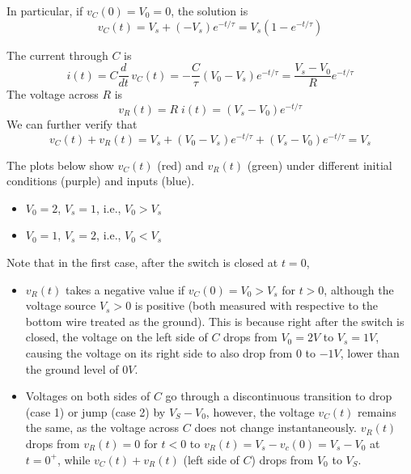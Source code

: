 \documentclass{article}
\begin{document}
In particular, if $v_C(0)=V_0=0$, the solution is
\begin{equation}
  v_C(t)=V_s+(-V_s) e^{-t/\tau}=V_s(1-e^{-t/\tau})		
\end{equation}

The current through $C$ is
\begin{equation}
  i(t)=C\frac{d}{dt}\,v_C(t)=-\frac{C}{\tau}(V_0-V_s)e^{-t/\tau}
  =\frac{V_s-V_0}{R}e^{-t/\tau} 
\end{equation}
The voltage across $R$ is
\begin{equation} 
  v_R(t)=R\; i(t)=(V_s-V_0) e^{-t/\tau} 
\end{equation}
We can further verify that
\begin{equation}
  v_C(t)+v_R(t)=V_s+(V_0-V_s) e^{-t/\tau}+(V_s-V_0) e^{-t/\tau} =V_s	
\end{equation}

The plots below show $v_C(t)$ (red) and $v_R(t)$ (green) under different
initial conditions (purple) and inputs (blue).

\begin{itemize}
\item $V_0=2$, $V_s=1$, i.e., $V_0>V_s$

\item $V_0=1$, $V_s=2$, i.e., $V_0<V_s$

\end{itemize}

Note that in the first case, after the switch is closed at $t=0$, 

\begin{itemize}
\item $v_R(t)$ takes a negative value if $v_C(0)=V_0>V_s$ for $t>0$, although
  the voltage source $V_s>0$ is positive (both measured with respective to 
  the bottom wire treated as the ground). This is because right after the
  switch is closed, the voltage on the left side of $C$ drops from 
  $V_0=2V$ to $V_s=1V$, causing the voltage on its right side to also drop 
  from $0$ to $-1V$, lower than the ground level of $0V$.
\item Voltages on both sides of $C$ go through a discontinuous transition to
  drop (case 1) or jump (case 2) by $V_S-V_0$, however, the voltage $v_C(t)$ 
  remains the same, as the voltage across $C$ does not change instantaneously. 
  $v_R(t)$ drops from $v_R(t)=0$ for $t<0$ to $v_R(t)=V_s-v_c(0)=V_s-V_0$ at 
  $t=0^+$, while $v_C(t)+v_R(t)$ (left side of $C$) drops from $V_0$ to $V_S$.
\end{itemize}
\end{document}
